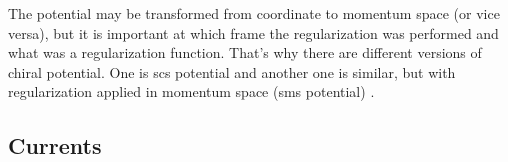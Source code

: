 The potential may be transformed from coordinate to momentum space (or vice versa),
but it is important at which frame the regularization was performed
and what was a regularization function. That's why there are different 
versions of chiral potential. One is \gls{scs} potential \cite{Epelbaum2014SCS}
and another one is similar, but with regularization applied in momentum space (\gls{sms} potential) \cite{reinkrebs2018}.


\subsection*{Currents}
 

